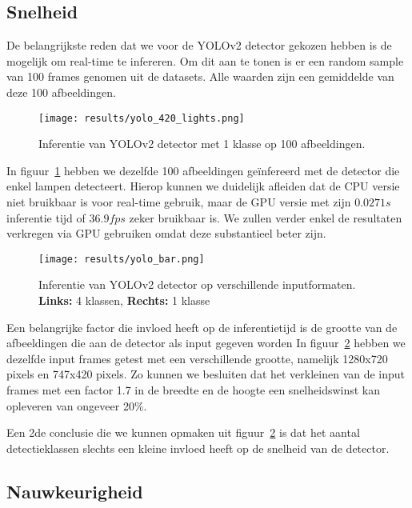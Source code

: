 \subsection{Snelheid}

De belangrijkste reden dat we voor de YOLOv2 detector gekozen hebben is de mogelijk om real-time te infereren.
Om dit aan te tonen is er een random sample van 100 frames genomen uit de datasets. Alle waarden zijn een gemiddelde van deze 100 afbeeldingen.

\begin{figure}
    \texttt{[image: results/yolo\_420\_lights.png]}
    \caption{Inferentie van YOLOv2 detector met 1 klasse op 100 afbeeldingen.}
    \label{fig:speed_lights}
\end{figure}

In figuur~\ref{fig:speed_lights} hebben we dezelfde 100 afbeeldingen ge\"{i}nfereerd met de detector die enkel lampen detecteert.
Hierop kunnen we duidelijk afleiden dat de \gls{CPU} versie niet bruikbaar is voor real-time gebruik, maar de \gls{GPU} versie
met zijn $0.0271 s$ inferentie tijd of $36.9 fps$ zeker bruikbaar is. We zullen verder enkel de resultaten verkregen via \gls{GPU}
gebruiken omdat deze substantieel beter zijn.

\begin{figure}[h]
    \texttt{[image: results/yolo\_bar.png]}
    \caption{Inferentie van YOLOv2 detector op verschillende inputformaten. \textbf{Links:} 4 klassen, \textbf{Rechts:} 1 klasse}
    \label{fig:speed_bar}
\end{figure}

Een belangrijke factor die invloed heeft op de inferentietijd is de grootte van de afbeeldingen die aan de detector als input gegeven worden
In figuur~\ref{fig:speed_bar} hebben we dezelfde input frames getest met een verschillende grootte, namelijk 1280x720 pixels en 747x420 pixels.
Zo kunnen we besluiten dat het verkleinen van de input frames met een factor 1.7 in de breedte en de hoogte een snelheidswinst kan opleveren van
ongeveer 20\%.

Een 2de conclusie die we kunnen opmaken uit figuur~\ref{fig:speed_bar} is dat het aantal detectieklassen slechts een kleine invloed heeft op de snelheid van de detector.


\subsection{Nauwkeurigheid}


